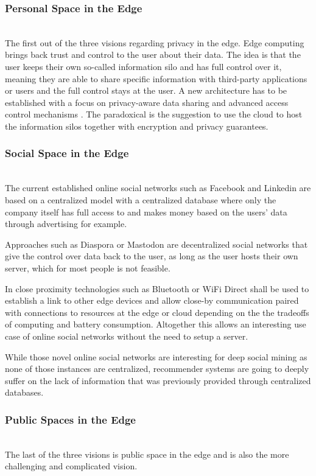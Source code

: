 \subsubsection{Personal Space in the Edge}\hspace*{\fill} \\
The first out of the three visions regarding privacy in the edge.
Edge computing brings back trust and control to the user about their data. The idea is that the user keeps their own so-called information silo and has full control over it, meaning they are able to share specific information with third-party applications or users and the full control stays at the user.
A new architecture has to be established with a focus on privacy-aware data sharing and advanced access control mechanisms \cite{GarciaLopez:2015:ECV:2831347.2831354}.
The paradoxical is the suggestion to use the cloud to host the information silos together with encryption and privacy guarantees.

\subsubsection{Social Space in the Edge}\hspace*{\fill} \\
The current established online social networks such as Facebook and Linkedin are based on a centralized model with a centralized database where only the company itself has full access to and makes money based on the users’ data through advertising for example.

Approaches such as Diaspora or Mastodon are decentralized social networks that give the control over data back to the user, as long as the user hosts their own server, which for most people is not feasible.

In close proximity technologies such as Bluetooth or WiFi Direct shall be used to establish a link to other edge devices and allow close-by communication paired with connections to resources at the edge or cloud depending on the the tradeoffs of computing and battery consumption. Altogether this allows an interesting use case of online social networks without the need to setup a server.

While those novel online social networks are interesting for deep social mining as none of those instances are centralized, recommender systems are going to deeply suffer on the lack of information that was previously provided through centralized databases.

\subsubsection{Public Spaces in the Edge}\hspace*{\fill} \\
The last of the three visions is public space in the edge and is also the more challenging and complicated vision.

